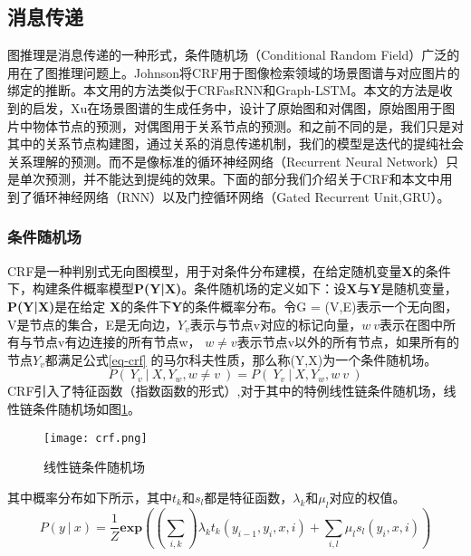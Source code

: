 
\subsection{消息传递}

图推理是消息传递的一种形式，条件随机场（Conditional Random Field）广泛的用在了图推理问题上。Johnson\cite{johnson2015image}将CRF用于图像检索领域的场景图谱与对应图片的绑定的推断。本文用的方法类似于CRFasRNN\cite{zheng2015conditional}和Graph-LSTM\cite{liang2016semantic}。本文的方法是收到\cite{xu2017scene}的启发，Xu在场景图谱的生成任务中，设计了原始图和对偶图，原始图用于图片中物体节点的预测，对偶图用于关系节点的预测。和之前不同的是，我们只是对其中的关系节点构建图，通过关系的消息传递机制，我们的模型是迭代的提纯社会关系理解的预测。而不是像标准的循环神经网络（Recurrent Neural Network）只是单次预测，并不能达到提纯的效果。下面的部分我们介绍关于CRF和本文中用到了循环神经网络（RNN）以及门控循环网络（Gated Recurrent Unit,GRU）。

\subsubsection{条件随机场}
CRF是一种判别式无向图模型，用于对条件分布建模，在给定随机变量\textbf{X}的条件下，构建条件概率模型\textbf{P(Y|X)}。条件随机场的定义如下：设\textbf{X}与\textbf{Y}是随机变量，\textbf{P(Y|X)}是在给定
\textbf{X}的条件下\textbf{Y}的条件概率分布。令G = (V,E)表示一个无向图，V是节点的集合，E是无向边，$Y_{v}$表示与节点v对应的标记向量，$w~v$表示在图中所有与节点v有边连接的所有节点w，
$w \neq v$表示节点v以外的所有节点，如果所有的节点$Y_v$都满足公式\ref{eq-crf}  的马尔科夫性质，那么称(Y,X)为一个条件随机场。
\begin{equation} \label{eq-crf}
    P(~Y_{v}~|~X,Y_w,w \neq v~) = P(~Y_v~|~X,Y_w,w~v~)
\end{equation}
CRF引入了特征函数（指数函数的形式）,对于其中的特例线性链条件随机场，线性链条件随机场如图\ref{fig:crf}。
\begin{figure}[htpb]
	\centering
	\texttt{[image: crf.png]}
    \caption{线性链条件随机场}
	\vspace*{-3.5mm}
	\label{fig:crf}
\end{figure}
其中概率分布如下所示，其中$t_{k}$和$s_{l}$都是特征函数，$\lambda_{k}$和$\mu_{l}$对应的权值。
\begin{equation}
    P(y~|~x) = \frac{1}{Z}\mathbf{exp}((\sum_{i,k})\lambda_{k}t_{k}(y_{i-1},y_{i},x,i)+\sum_{i,l}\mu_{l}s_{l}(y_{i},x,i))
\end{equation}


